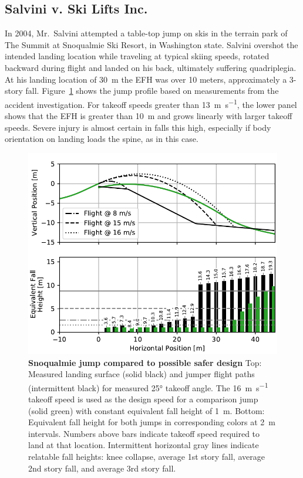 \documentclass[smallextended]{svjour3}       %
\begin{document}
\subsection{Salvini v. Ski Lifts Inc.}
\label{sec:salvini}
%
In 2004, Mr.~Salvini attempted a table-top jump on skis in the terrain park of
The Summit at Snoqualmie Ski Resort, in Washington state. Salvini overshot the
intended landing location while traveling at typical skiing speeds, rotated
backward during flight and landed on his back, ultimately suffering
quadriplegia. At his landing location of 30~\si{\meter} the EFH was over 10 meters, approximately a 3-story fall.
Figure~\ref{fig:salvini-v-snoqualmie} shows the jump profile based on
measurements from the accident investigation.  For takeoff speeds greater than
13~\si{\meter\per\second}, the lower panel shows that the EFH is greater than 10~\si{\meter} and grows linearly with larger takeoff
speeds. Severe injury is almost certain in falls this high, especially if
body orientation on landing loads the spine, as in this case.
%
\begin{figure}
  \centering
  \includegraphics[width=5.25in]{figures/salvini-v-snoqualmie.pdf}
  \caption{\textbf{Snoqualmie jump compared to possible safer design}
  Top: Measured landing surface (solid black) and jumper flight paths
  (intermittent black) for measured 25\si{\degree} takeoff angle. The
  16~\si{\meter\per\second} takeoff speed is used as the design speed for a
  comparison jump (solid green) with constant equivalent fall height of
  1~\si{\meter}.
  Bottom: Equivalent fall height for both jumps in corresponding colors
  at 2~\si{\meter} intervals. Numbers above bars indicate takeoff speed
  required to land at that location.
  Intermittent horizontal gray lines indicate relatable fall heights: knee
  collapse, average 1st story fall, average 2nd story fall, and average 3rd
  story fall.
  }
  \label{fig:salvini-v-snoqualmie}
\end{figure}
\end{document}
